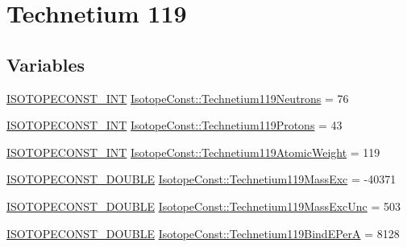 \hypertarget{group___isotope_const-_technetium-_tc119}{}\section{Technetium 119}
\label{group___isotope_const-_technetium-_tc119}
\subsection*{Variables}
\begin{DoxyCompactItemize}
\item 
\mbox{\hyperlink{group___isotope_const-_macros_ga5f18360b3e99483a35c32d789e62621c}{I\+S\+O\+T\+O\+P\+E\+C\+O\+N\+S\+T\+\_\+\+I\+NT}} \mbox{\hyperlink{group___isotope_const-_technetium-_tc119_gacd28112ef733cfd2d000368d536d69a2}{Isotope\+Const\+::\+Technetium119\+Neutrons}} = 76
\item 
\mbox{\hyperlink{group___isotope_const-_macros_ga5f18360b3e99483a35c32d789e62621c}{I\+S\+O\+T\+O\+P\+E\+C\+O\+N\+S\+T\+\_\+\+I\+NT}} \mbox{\hyperlink{group___isotope_const-_technetium-_tc119_ga4b907bf90b82d82190f243f1c97b4d1a}{Isotope\+Const\+::\+Technetium119\+Protons}} = 43
\item 
\mbox{\hyperlink{group___isotope_const-_macros_ga5f18360b3e99483a35c32d789e62621c}{I\+S\+O\+T\+O\+P\+E\+C\+O\+N\+S\+T\+\_\+\+I\+NT}} \mbox{\hyperlink{group___isotope_const-_technetium-_tc119_ga41fb256c9e9f851bf3481b5e00d448b8}{Isotope\+Const\+::\+Technetium119\+Atomic\+Weight}} = 119
\item 
\mbox{\hyperlink{group___isotope_const-_macros_ga8f45a7272ce02c0b4c65c44636ed719a}{I\+S\+O\+T\+O\+P\+E\+C\+O\+N\+S\+T\+\_\+\+D\+O\+U\+B\+LE}} \mbox{\hyperlink{group___isotope_const-_technetium-_tc119_ga0ff968fbc473674549680f4637ac30c3}{Isotope\+Const\+::\+Technetium119\+Mass\+Exc}} = -\/40371
\item 
\mbox{\hyperlink{group___isotope_const-_macros_ga8f45a7272ce02c0b4c65c44636ed719a}{I\+S\+O\+T\+O\+P\+E\+C\+O\+N\+S\+T\+\_\+\+D\+O\+U\+B\+LE}} \mbox{\hyperlink{group___isotope_const-_technetium-_tc119_gaa9ab0f96909c3dc96fafb6a593a0f6be}{Isotope\+Const\+::\+Technetium119\+Mass\+Exc\+Unc}} = 503
\item 
\mbox{\hyperlink{group___isotope_const-_macros_ga8f45a7272ce02c0b4c65c44636ed719a}{I\+S\+O\+T\+O\+P\+E\+C\+O\+N\+S\+T\+\_\+\+D\+O\+U\+B\+LE}} \mbox{\hyperlink{group___isotope_const-_technetium-_tc119_ga858715d0c2c950dc9b76e9cea908e904}{Isotope\+Const\+::\+Technetium119\+Bind\+E\+PerA}} = 8128
\item 

\end{DoxyCompactItemize}
